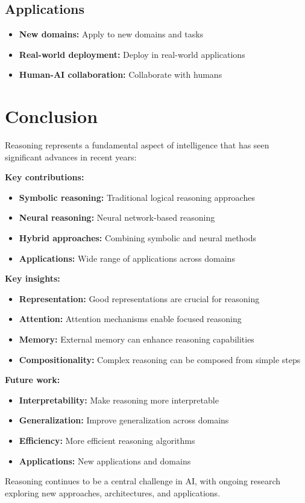 \subsection{Applications}

\begin{itemize}
    \item \textbf{New domains:} Apply to new domains and tasks
    \item \textbf{Real-world deployment:} Deploy in real-world applications
    \item \textbf{Human-AI collaboration:} Collaborate with humans
\end{itemize}

\section{Conclusion}

Reasoning represents a fundamental aspect of intelligence that has seen significant advances in recent years:

\textbf{Key contributions:}
\begin{itemize}
    \item \textbf{Symbolic reasoning:} Traditional logical reasoning approaches
    \item \textbf{Neural reasoning:} Neural network-based reasoning
    \item \textbf{Hybrid approaches:} Combining symbolic and neural methods
    \item \textbf{Applications:} Wide range of applications across domains
\end{itemize}

\textbf{Key insights:}
\begin{itemize}
    \item \textbf{Representation:} Good representations are crucial for reasoning
    \item \textbf{Attention:} Attention mechanisms enable focused reasoning
    \item \textbf{Memory:} External memory can enhance reasoning capabilities
    \item \textbf{Compositionality:} Complex reasoning can be composed from simple steps
\end{itemize}

\textbf{Future work:}
\begin{itemize}
    \item \textbf{Interpretability:} Make reasoning more interpretable
    \item \textbf{Generalization:} Improve generalization across domains
    \item \textbf{Efficiency:} More efficient reasoning algorithms
    \item \textbf{Applications:} New applications and domains
\end{itemize}

Reasoning continues to be a central challenge in AI, with ongoing research exploring new approaches, architectures, and applications.
